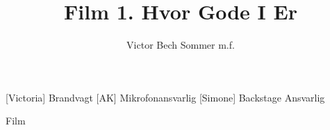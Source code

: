 \documentclass[a4paper,11pt]{article}
\title{Film 1. Hvor Gode I Er}
\author{Victor Bech Sommer m.f. }
\begin{document}
\maketitle

\begin{roles}
[Victoria] Brandvagt
[AK] Mikrofonansvarlig
[Simone] Backstage Ansvarlig
\end{roles}

\begin{song}
Film
\end{song}
\end{document}
